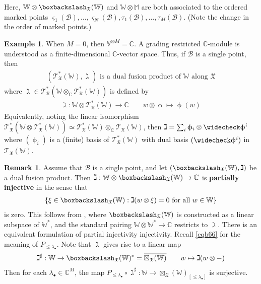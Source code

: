 \documentclass[11pt,b5paper,notitlepage]{article}
\theoremstyle{definition}
\newtheorem{eg}[df]{Example}
\newtheorem{rem}[df]{Remark}
\theoremstyle{plain}
\newcommand{\wch}{\widecheck}
\newcommand{\ovl}{\overline}
\newcommand{\scr}{\mathscr}
\newcommand{\sgm}{\varsigma}
\newcommand{\blt}{\bullet}
\newcommand{\Vbb}{\mathbb V}
\newcommand{\Wbb}{\mathbb W}
\newcommand{\Mbb}{\mathbb M}
\newcommand{\Cbb}{\mathbb C}
\newcommand{\<}{\left\langle}
\renewcommand{\>}{\right\rangle}
\newcommand{\MB}{\mathcal{B}}
\newcommand{\fx}{\mathfrak{X}}
\newcommand{\bbs}{\boxbackslash}
\numberwithin{equation}{section}
\begin{document}
Here, $\Wbb\otimes\bbs_\fx(\Wbb)$ and $\Wbb\otimes\Mbb$ are both associated to the ordered marked points $\sgm_1(\MB),\dots,\sgm_N(\MB),\tau_1(\MB),\dots,\tau_M(\MB)$. (Note the change in the order of marked points.)

\begin{eg}
When $M=0$, then $\Vbb^{\otimes M}=\Cbb$. A grading restricted $\Cbb$-module is understood as a finite-dimensional $\Cbb$-vector space. Thus, if $\MB$ is a single point, then
\begin{align*}
(\scr T_\fx^*(\Wbb),\gimel)\text{ is a dual fusion product of $\Wbb$ along $\fx$}
\end{align*}
where $\gimel\in \scr T_\fx^*(\Wbb\otimes_\Cbb\scr T_\fx^*(\Wbb))$ is defined by
\begin{align*}
\gimel:\Wbb\otimes\scr T_\fx^*(\Wbb)\rightarrow\Cbb\qquad w\otimes\upphi\mapsto\upphi(w)
\end{align*}
Equivalently, noting the linear isomorphism $\scr T_\fx^*(\Wbb\otimes\scr T_\fx^*(\Wbb))\simeq \scr T_\fx^*(\Wbb)\otimes_\Cbb \scr T_\fx(\Wbb)$, then $\gimel=\sum_i\upphi_i\otimes\wch\upphi^i$ where $(\upphi_i)$ is a (finite) basis of $\scr T_\fx^*(\Wbb)$ with dual basis $(\wch\upphi^i)$ in $\scr T_\fx(\Wbb)$.
\end{eg}



\begin{rem}\label{lbb55}
Assume that $\MB$ is a single point, and let $(\bbs_\fx(\Wbb),\gimel)$ be a dual fusion product. Then $\gimel:\Wbb\otimes\bbs_\fx(\Wbb)\rightarrow\Cbb$ is \textbf{partially injective} in the sense that
\begin{align}\label{eqb67}
\{\xi\in\bbs_\fx(\Wbb):\gimel(w\otimes\xi)=0\text{ for all }w\in\Wbb\}
\end{align}
is zero. This follows from \cite[Ch. 3]{GZ1}, where $\bbs_\fx(\Wbb)$ is constructed as a linear subspace of $\Wbb^*$, and the standard pairing $\Wbb\otimes\Wbb^*\rightarrow\Cbb$ restricts to $\gimel$. There is an equivalent formulation of partial injectivity injectivity. Recall \eqref{eqb66} for the meaning of $P_{\leq\lambda_\blt}$. Note that $\gimel$ gives rise to a linear map
\begin{align*}
\gimel^\sharp:\Wbb\rightarrow\bbs_\fx(\Wbb)^*=\ovl{\boxtimes_\fx(\Wbb)}\qquad w\mapsto \gimel(w\otimes-)
\end{align*}
Then for each $\lambda_\blt\in\Cbb^M$, the map $P_{\leq\lambda_\blt}\circ\gimel^\sharp:\Wbb\rightarrow \boxtimes_\fx(\Wbb)_{[\leq\lambda_\blt]}$ is surjective.
\end{rem}
\end{document}
